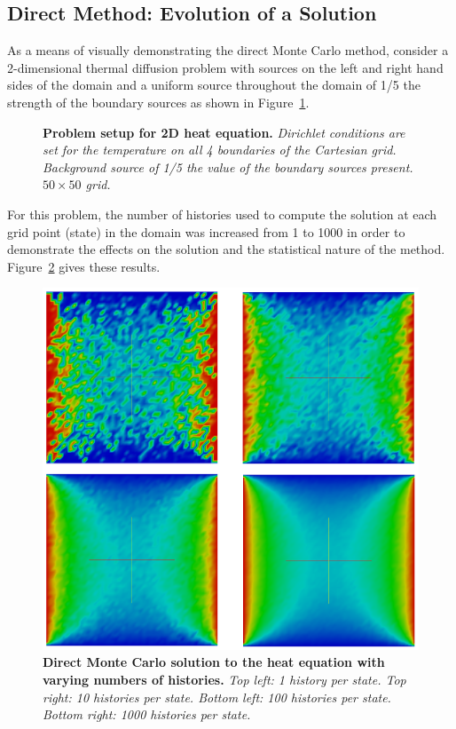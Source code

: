 \subsection{Direct Method: Evolution of a Solution}
\label{subsec:direct_evolution}
As a means of visually demonstrating the direct Monte Carlo method,
consider a 2-dimensional thermal diffusion problem with sources on the
left and right hand sides of the domain and a uniform source
throughout the domain of 1/5 the strength of the boundary sources as
shown in Figure~\ref{fig:heat_setup}.
\begin{figure}[t!]
  \begin{center}
    \scalebox{1.2}{  }
  \end{center}
  \caption{\textbf{Problem setup for 2D heat equation.}
    \textit{Dirichlet conditions are set for the temperature on all 4
      boundaries of the Cartesian grid. Background source of 1/5 the
      value of the boundary sources present. $50 \times 50$ grid.}}
  \label{fig:heat_setup}
\end{figure}
For this problem, the number of histories used to compute the solution
at each grid point (state) in the domain was increased from 1 to 1000
in order to demonstrate the effects on the solution and the
statistical nature of the method. Figure~\ref{fig:direct_evolution}
gives these results.
\begin{figure}[t!]
  \begin{center}
    \includegraphics[width=5in]{chapters/mc_background/direct_evolution.png}
  \end{center}
  \caption{\textbf{Direct Monte Carlo solution to the heat equation
      with varying numbers of histories.} \textit{Top left: 1 history
      per state. Top right: 10 histories per state. Bottom left: 100
      histories per state. Bottom right: 1000 histories per state.}}
  \label{fig:direct_evolution}
\end{figure}
